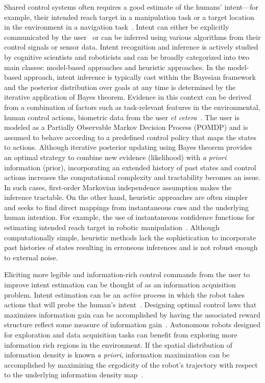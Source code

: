 Shared control systems often requires a good estimate of the humans' intent---for example, their intended reach target in a manipulation task or a target location in the environment in a navigation task~\cite{liu2016goal}. Intent can either be explicitly communicated by the user~\cite{choi2008laser} or can be inferred using various algorithms from their control signals or sensor data. Intent recognition and inference is actively studied by cognitive scientists and roboticists and can be broadly categorized into two main classes: model-based approaches and heuristic approaches. In the model-based approach, intent inference is typically cast within the Bayesian framework and the posterior distribution over goals at any time is determined by the iterative application of Bayes theorem. Evidence in this context can be derived from a combination of factors such as task-relevant features in the environmental, human control actions, biometric data from the user \textit{et cetera}~\cite{baker2007goal, baker2009action}. The user is modeled as a Partially Observable Markov Decision Process (POMDP) and is assumed to behave according to a predefined control policy that maps the states to actions. Although iterative posterior updating using Bayes theorem provides an optimal strategy to combine new evidence (likelihood) with \textit{a priori} information (prior), incorporating an extended history of past states and control actions increases the computational complexity and tractability becomes an issue. In such cases,  first-order Markovian independence assumption makes the inference tractable. On the other hand, heuristic approaches are often simpler and seeks to find direct mappings from instantaneous cues and the underlying human intention. For example, the use of instantaneous confidence functions for estimating intended reach target in robotic manipulation~\cite{dragan2012assistive, gopinath2017human}. Although computationally simple, heuristic methods lack the sophistication to incorporate past histories of states resulting in erroneous inferences and is not robust enough to external noise. 

Eliciting more legible and information-rich control commands from the user to improve intent estimation can be thought of as an information acquisition problem. Intent estimation can be an \textit{active} process in which the robot takes actions that will probe the human's intent~\cite{sadigh2016information, sadigh2016planning}. Designing optimal control laws that maximizes information gain can be accomplished by having the associated reward structure reflect some measure of information gain~\cite{atanasov2014information}. 
Autonomous robots designed for exploration and data acquisition tasks can benefit from exploring more information rich regions in the environment. If the spatial distribution of information density is known \textit{a priori}, information maximization can be accomplished by maximizing the ergodicity of the robot's trajectory with respect to the underlying information density map~\cite{miller2016ergodic, miller2013trajectory}. 

